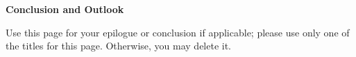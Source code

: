 
\begin{center}
\pagebreak
\vspace*{5\baselineskip}
\textbf{\large Conclusion and Outlook}
\end{center}


\begin{flushleft}
\hspace{10mm}Use this page for your epilogue or conclusion if applicable; please use only one of the titles for this page. Otherwise, you may delete it.
\end{flushleft}




